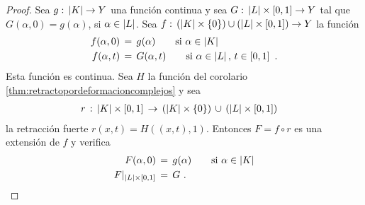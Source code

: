 \begin{proof}
	Sea $g:\,\left|K\right|\rightarrow Y$ una funci\'{o}n continua y sea
	$G:\,\left|L\right|\times\left[0,1\right]\rightarrow Y$ tal que
	$G(\alpha,0)=g(\alpha)$, si $\alpha\in\left|L\right|$. Sea
	$f:\,(\left|K\right|\times\{0\})\cup(\left|L\right|\times\left[0,1\right])\rightarrow Y$
	la funci\'{o}n
	\begin{align*}
		f(\alpha,0) & \,=\,g(\alpha)
			\qquad\text{si }\alpha\in\left|K\right| \\
		f(\alpha,t) & \,=\,G(\alpha,t)
			\qquad\text{si }\alpha\in\left|L\right|,\,t\in\left[0,1\right]
		\text{ .}
	\end{align*}
	Esta funci\'{o}n es continua. Sea $H$ la funci\'{o}n del
	corolario \ref{thm:retractopordeformacioncomplejos} y sea
	\begin{align*}
		& r\,:\,\left|K\right|\times\left[0,1\right]\,\rightarrow\,
			(\left|K\right|\times\{0\})\,\cup\,(\left|L\right|\times\left[0,1\right])
	\end{align*}
	la retracci\'{o}n fuerte $r(x,t)=H((x,t),1)$. Entonces
	$F=f\circ r$ es una extensi\'{o}n de $f$ y verifica
	\begin{align*}
		F(\alpha,0) & \,=\,g(\alpha)
			\qquad\text{si }\alpha\in\left|K\right| \\
		F|_{\left|L\right|\times\left[0,1\right]} & \,=\,G
		\text{ .}
	\end{align*}
\end{proof}
